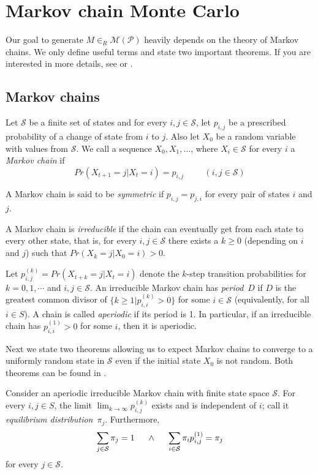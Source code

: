 \chapter{Markov chain Monte Carlo}
\label{chap:mcmc}
Our goal to generate $M\in_R\mathcal{M}(\mathcal{P})$ heavily depends on the theory of Markov chains. We only define useful terms and state two important theorems. If you are interested in more details, see \cite{Madras} or \cite{Karlin}.

\section{Markov chains}
\begin{defn}
Let $\mathcal{S}$ be a finite set of states and for every $i,j\in\mathcal{S}$, let $p_{i,j}$ be a prescribed probability of a change of state from $i$ to $j$. Also let $X_0$ be a random variable with values from $\mathcal{S}$. We call a sequence $X_0,X_1,\dots$, where $X_i\in\mathcal{S}$ for every $i$ a \emph{Markov chain} if
$$Pr(X_{t+1}=j|X_t=i)=p_{i,j} \hspace{1cm} (i,j\in\mathcal{S})$$
\end{defn}
\begin{defn}
A Markov chain is said to be \emph{symmetric} if $p_{i,j}=p_{j,i}$ for every pair of states $i$ and $j$.
\end{defn}
\begin{defn}
A Markov chain is \emph{irreducible} if the chain can eventually get from each state to every other state, that is, for every $i,j\in\mathcal{S}$ there exists a $k\geq0$ (depending on $i$ and $j$) such that $Pr(X_k=j|X_0=i)>0$.
\end{defn}
\begin{defn}
Let $p_{i,j}^{(k)}=Pr(X_{t+k}=j|X_t=i)$ denote the $k$-step transition probabilities for $k=0,1,\cdots$ and $i,j\in\mathcal{S}$. An irreducible Markov chain has \emph{period}~$D$ if $D$ is the greatest common divisor of $\{k\geq1|p_{i,i}^{(k)}>0\}$ for some $i\in\mathcal{S}$ (equivalently, for all $i\in S$). A chain is called \emph{aperiodic} if its period is 1. In particular, if an irreducible chain has $p_{i,i}^{(1)}>0$ for some $i$, then it is aperiodic.
\end{defn}
Next we state two theorems allowing us to expect Markov chains to converge to a uniformly random state in $\mathcal{S}$ even if the initial state $X_0$ is not random. Both theorems can be found in \cite{Madras}.
\begin{thm}
Consider an aperiodic irreducible Markov chain with finite state space $\mathcal{S}$. For every $i,j\in S$, the limit $\lim_{k\rightarrow\infty}p_{i,j}^{(k)}$ exists and is independent of $i$; call it \emph{equilibrium distribution}~$\pi_j$. Furthermore, $$\sum\limits_{j\in\mathcal{S}}\pi_j=1\hspace{5mm}\wedge\hspace{5mm}\sum\limits_{i\in\mathcal{S}}\pi_ip_{i,j}^{(1)}=\pi_j$$
for every $j\in\mathcal{S}$.
\end{thm}
